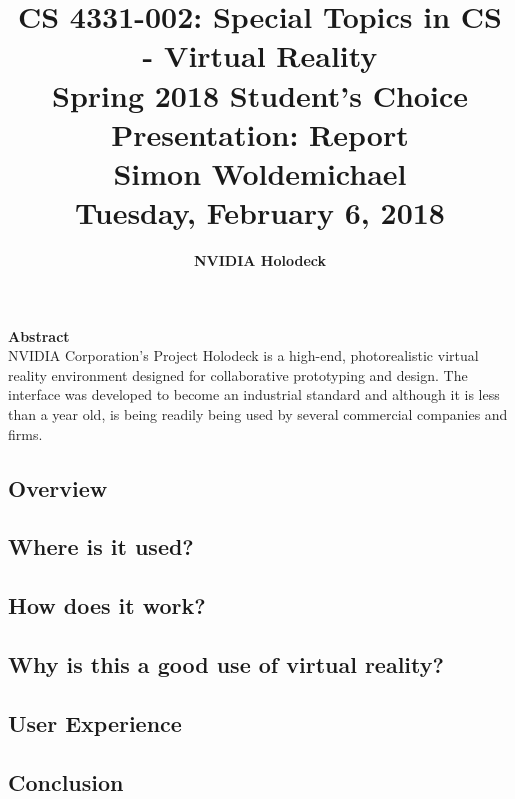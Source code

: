 \documentclass[11pt]{article}
\begin{document}
\title{\Large CS 4331-002: Special Topics in CS - Virtual Reality \\ Spring 2018 Student's Choice Presentation: Report \\ \Large Simon Woldemichael \\ Tuesday, February 6, 2018 \\}
\author{\LARGE \textbf{NVIDIA Holodeck}}
\date{}

\maketitle
\vspace{-1cm}
\hspace{10pt}
\begin{center}
\textbf{Abstract}\\
NVIDIA Corporation's Project Holodeck is a high-end, photorealistic virtual reality environment designed for collaborative prototyping and design. The interface was developed to become an industrial standard and although it is less than a year old, is being readily being used by several commercial companies and firms.
\end{center}
\subsection*{Overview}
\subsection*{Where is it used?}
\subsection*{How does it work?}
\subsection*{Why is this a good use of virtual reality?}
\subsection*{User Experience}
\subsection*{Conclusion}

\newpage


\end{document}
